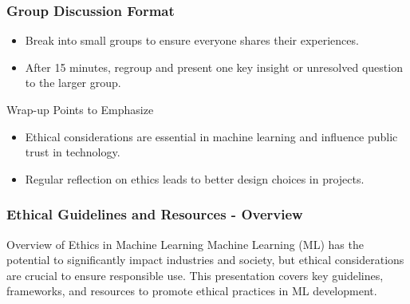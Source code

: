 \documentclass[aspectratio=169]{beamer}
\begin{document}
\begin{frame}[fragile]
    \frametitle{Group Discussion Format}

    \begin{itemize}
        \item Break into small groups to ensure everyone shares their experiences.
        \item After 15 minutes, regroup and present one key insight or unresolved question to the larger group.
    \end{itemize}
    
    \begin{block}{Wrap-up Points to Emphasize}
        \begin{itemize}
            \item Ethical considerations are essential in machine learning and influence public trust in technology.
            \item Regular reflection on ethics leads to better design choices in projects.
        \end{itemize}
    \end{block}
    
\end{frame}

\begin{frame}[fragile]
    \frametitle{Ethical Guidelines and Resources - Overview}
    \begin{block}{Overview of Ethics in Machine Learning}
        Machine Learning (ML) has the potential to significantly impact industries and society, but ethical considerations are crucial to ensure responsible use. This presentation covers key guidelines, frameworks, and resources to promote ethical practices in ML development.
    \end{block}
\end{frame}
\end{document}
